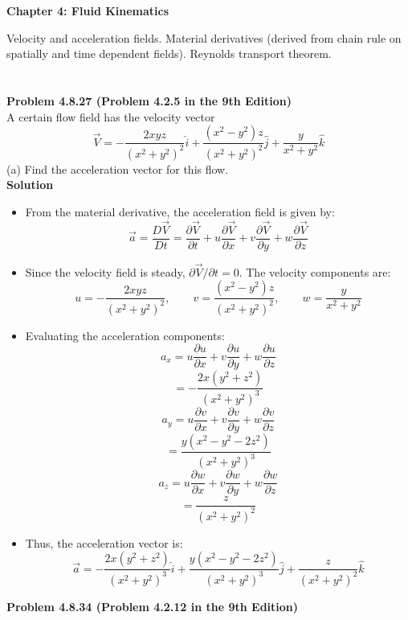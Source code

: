 ﻿\documentclass[12pt]{article}
\begin{document}
\begin{center}
    {\LARGE\bfseries Chapter 4: Fluid Kinematics\par}
\end{center}
Velocity and acceleration fields. Material derivatives (derived from chain rule on spatially and time dependent fields). Reynolds transport theorem.


\section*{}
\textbf{Problem 4.8.27 (Problem 4.2.5 in the 9th Edition)}\\
A certain flow field has the velocity vector
\[\vec{V}=-\frac{2xyz}{(x^2+y^2)^2}\hat{i}+\frac{(x^2-y^2)z}{(x^2+y^2)^2}\hat{j}+\frac{y}{x^2+y^2}\hat{k}\]
(a) Find the acceleration vector for this flow.\\
\textbf{Solution}
\begin{itemize}
    \item From the material derivative, the acceleration field is given by:
    \[\vec{a}=\frac{D\vec{V}}{Dt}=\frac{\partial\vec{V}}{\partial t}+u\frac{\partial\vec{V}}{\partial x}+v\frac{\partial\vec{V}}{\partial y}+w\frac{\partial\vec{V}}{\partial z}\]
    \item Since the velocity field is steady, $\partial\vec{V}/\partial t=0$. The velocity components are:
    \[u=-\frac{2xyz}{(x^2+y^2)^2},\qquad v=\frac{(x^2-y^2)z}{(x^2+y^2)^2},\qquad w=\frac{y}{x^2+y^2}\]
    \item Evaluating the acceleration components:
    \[a_x=u\frac{\partial u}{\partial x}+v\frac{\partial u}{\partial y}+w\frac{\partial u}{\partial z}\]
    \[=\boxed{-\frac{2x(y^2+z^2)}{(x^2+y^2)^3}}\]
    \[a_y=u\frac{\partial v}{\partial x}+v\frac{\partial v}{\partial y}+w\frac{\partial v}{\partial z}\]
    \[=\boxed{\frac{y(x^2-y^2-2z^2)}{(x^2+y^2)^3}}\]
    \[a_z=u\frac{\partial w}{\partial x}+v\frac{\partial w}{\partial y}+w\frac{\partial w}{\partial z}\]
    \[=\boxed{\frac{z}{(x^2+y^2)^2}}\]
    \item Thus, the acceleration vector is:
    \[\boxed{\vec{a}=-\frac{2x(y^2+z^2)}{(x^2+y^2)^3}\hat{i}+\frac{y(x^2-y^2-2z^2)}{(x^2+y^2)^3}\hat{j}+\frac{z}{(x^2+y^2)^2}\hat{k}}\]
\end{itemize}
\textbf{Problem 4.8.34 (Problem 4.2.12 in the 9th Edition)}\\
\end{document}
